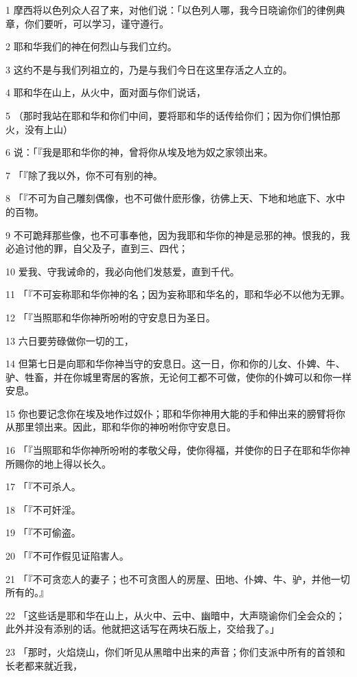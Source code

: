 \par 1 摩西将以色列众人召了来，对他们说：「以色列人哪，我今日晓谕你们的律例典章，你们要听，可以学习，谨守遵行。
\par 2 耶和华我们的神在何烈山与我们立约。
\par 3 这约不是与我们列祖立的，乃是与我们今日在这里存活之人立的。
\par 4 耶和华在山上，从火中，面对面与你们说话，
\par 5 （那时我站在耶和华和你们中间，要将耶和华的话传给你们；因为你们惧怕那火，没有上山）
\par 6 说：「『我是耶和华你的神，曾将你从埃及地为奴之家领出来。
\par 7 「『除了我以外，你不可有别的神。
\par 8 「『不可为自己雕刻偶像，也不可做什麽形像，彷佛上天、下地和地底下、水中的百物。
\par 9 不可跪拜那些像，也不可事奉他，因为我耶和华你的神是忌邪的神。恨我的，我必追讨他的罪，自父及子，直到三、四代；
\par 10 爱我、守我诫命的，我必向他们发慈爱，直到千代。
\par 11 「『不可妄称耶和华你神的名；因为妄称耶和华名的，耶和华必不以他为无罪。
\par 12 「『当照耶和华你神所吩咐的守安息日为圣日。
\par 13 六日要劳碌做你一切的工，
\par 14 但第七日是向耶和华你神当守的安息日。这一日，你和你的儿女、仆婢、牛、驴、牲畜，并在你城里寄居的客旅，无论何工都不可做，使你的仆婢可以和你一样安息。
\par 15 你也要记念你在埃及地作过奴仆；耶和华你神用大能的手和伸出来的膀臂将你从那里领出来。因此，耶和华你的神吩咐你守安息日。
\par 16 「『当照耶和华你神所吩咐的孝敬父母，使你得福，并使你的日子在耶和华你神所赐你的地上得以长久。
\par 17 「『不可杀人。
\par 18 「『不可奸淫。
\par 19 「『不可偷盗。
\par 20 「『不可作假见证陷害人。
\par 21 「『不可贪恋人的妻子；也不可贪图人的房屋、田地、仆婢、牛、驴，并他一切所有的。』
\par 22 「这些话是耶和华在山上，从火中、云中、幽暗中，大声晓谕你们全会众的；此外并没有添别的话。他就把这话写在两块石版上，交给我了。」
\par 23 「那时，火焰烧山，你们听见从黑暗中出来的声音；你们支派中所有的首领和长老都来就近我，
